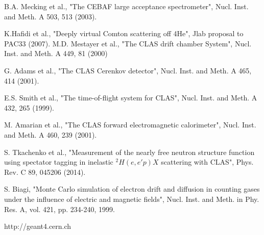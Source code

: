 \documentclass[aps,prl,twocolumn,showpacs,superscriptaddress,groupedaddress]{revtex4}
\begin{document}
\begin{thebibliography}{99}

B.A. Mecking et al., "The CEBAF large acceptance spectrometer", Nucl. Inst. and Meth. A 503, 513 (2003).

K.Hafidi et al., "Deeply virtual Comton scattering off 4He", Jlab proposal to PAC33 (2007).
M.D. Mestayer et al., "The CLAS drift chamber System", Nucl. Inst. and Meth. A 449, 81 (2000)

G. Adams et al., "The CLAS Cerenkov detector", Nucl. Inst. and Meth. A 465, 414 (2001).

E.S. Smith et al., "The time-of-flight system for CLAS", Nucl. Inst. and Meth. A 432, 265 (1999).

M. Amarian et al., "The CLAS forward electromagnetic calorimeter", Nucl. Inst. and Meth. A 460, 239 (2001). 

S. Tkachenko et al., "Measurement of the nearly free neutron structure function using spectator tagging in inelastic $^{2}H(e,e'p)X$ scattering with CLAS",	Phys. Rev. C 89, 045206 (2014).

S. Biagi, "Monte Carlo simulation of electron drift and diffusion in counting gases under the influence of electric and magnetic fields", Nucl. Inst. and Meth. in Phy. Res. A, vol. 421, pp. 234-240, 1999.

http://geant4.cern.ch

\end{thebibliography}
\end{document}
